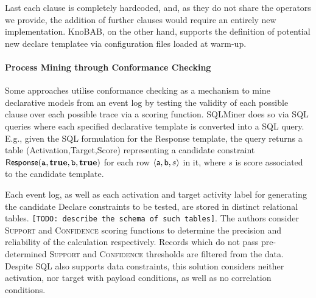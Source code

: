 Last each clause is completely hardcoded, and, as they do not share the operators we provide, the addition of further clauses would require an entirely new implementation. KnoBAB, on the other hand, supports the definition of potential new declare templatee via configuration files loaded at warm-up. %




\paragraph*{Process Mining through Conformance Checking}
Some approaches utilise conformance checking as a mechanism to mine declarative {models}  from an event log {by testing the validity of each possible clause over each possible trace} via a scoring function. SQLMiner \cite{SchonigRCJM16} {does so via} SQL queries \cite{Schonig15} {where e}ach specified declarative {template} %
{is} converted into a SQL query. E.g., given the SQL formulation for the \textsf{Response} template, the query returns a table \textsf{(Activation,Target,Score)} representing a candidate constraint $\textsf{Response}(\texttt{a},\textbf{true},\texttt{b},\textbf{true})$ for each row $\braket{\textsf{a},\textsf{b},s}$ in it, where $s$ is   score associated to the candidate template.

Each event log, as well as each activation and target activity label for generating the candidate Declare constraints to be tested, are stored in distinct relational tables. \texttt{\color{red}[TODO: describe the schema of such tables]}. The authors consider 
\textsc{Support} and \textsc{Confidence} scoring functions to determine the precision and reliability of the calculation respectively. Records which do not pass pre-determined \textsc{Support} and \textsc{Confidence} thresholds are filtered from the data. {Despite } SQL also supports data constraints, this solution considers neither activation, nor target %
with payload conditions, as well as no correlation conditions.

